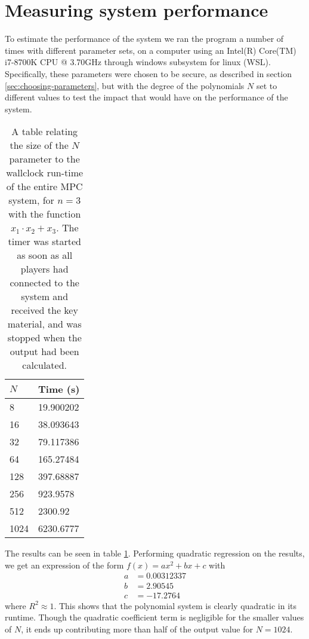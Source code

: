 \documentclass[../main.tex]{subfiles}
\begin{document}
\section{Measuring system performance}
To estimate the performance of the system we ran the program a number of times with different parameter sets, on a computer using an Intel(R) Core(TM) i7-8700K CPU @ 3.70GHz through windows subsystem for linux (WSL).
Specifically, these parameters were chosen to be secure, as described in section \ref{sec:choosing-parameters}, but with the degree of the polynomials $N$ set to different values to test the impact that would have on the performance of the system.

\begin{table}
    \centering
    \begin{tabular}{l|l}
        $N$  & Time (s)  \\
        \hline
        8    & 19.900202 \\
        16   & 38.093643 \\
        32   & 79.117386 \\
        64   & 165.27484 \\
        128  & 397.68887 \\
        256  & 923.9578  \\
        512  & 2300.92   \\
        1024 & 6230.6777
    \end{tabular}
    \caption{A table relating the size of the $N$ parameter to the wallclock run-time of the entire MPC system, for $n = 3$ with the function $x_1 \cdot x_2 + x_3$. The timer was started as soon as all players had connected to the system and received the key material, and was stopped when the output had been calculated.}
    \label{tab:synthetic-division-performance}
\end{table}

The results can be seen in table \ref{tab:synthetic-division-performance}. Performing quadratic regression on the results, we get an expression of the form $f(x) = a x^2 + b x + c$ with
\begin{align*}
    a & = 0.00312337 \\
    b & = 2.90545    \\
    c & = -17.2764
\end{align*}
where $R^2 \approx 1$. This shows that the polynomial system is clearly quadratic in its runtime. Though the quadratic coefficient term is negligible for the smaller values of $N$, it ends up contributing more than half of the output value for $N = 1024$.
\end{document}
